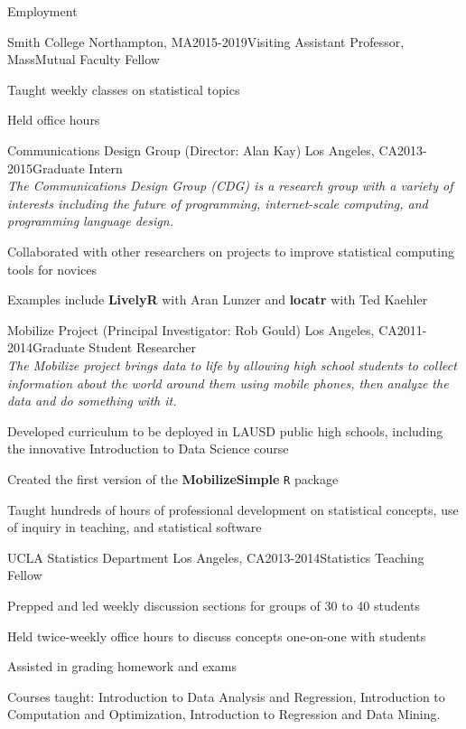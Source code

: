 \documentclass{resume} %
\begin{document}
\begin{rSection}{Employment}

\begin{rSubsection}{Smith College}{ Northampton, MA}{2015-2019}{Visiting Assistant Professor, MassMutual Faculty Fellow} 
\item Taught weekly classes on statistical topics
\item Held office hours
\end{rSubsection}

\begin{rSubsection}{Communications Design Group } {(Director: Alan Kay) \hfill Los Angeles, CA}{2013-2015}{Graduate Intern \\ {\em The Communications Design Group (CDG) is a research group with a variety of interests including the future of programming, internet-scale computing, and programming language design.}}
\item Collaborated with other researchers on projects to improve statistical computing tools for novices
\item Examples include \textbf{LivelyR} with Aran Lunzer and \textbf{locatr} with Ted Kaehler
\end{rSubsection}


\begin{rSubsection}{Mobilize Project }{(Principal Investigator: Rob Gould) \hfill Los Angeles, CA}{2011-2014}{Graduate Student Researcher \\ {\em The Mobilize project brings data to life by allowing high school students to collect information about the world around them using mobile phones, then analyze the data and do something with it.}}
\item Developed curriculum to be deployed in LAUSD public high schools, including the innovative Introduction to Data Science course
\item Created the first version of the \textbf{MobilizeSimple} \verb#R# package
\item Taught hundreds of hours of professional development on statistical concepts, use of inquiry in teaching, and statistical software
\end{rSubsection}


\begin{rSubsection}{UCLA Statistics Department }{\hfill Los Angeles, CA}{2013-2014}{Statistics Teaching Fellow}
\item Prepped and led weekly discussion sections for groups of 30 to 40 students
\item Held twice-weekly office hours to discuss concepts one-on-one with students
\item Assisted in grading homework and exams
\item Courses taught: Introduction to Data Analysis and Regression, Introduction to Computation and Optimization, Introduction to Regression and Data Mining.
\end{rSubsection}

\end{rSection}
\end{document}
